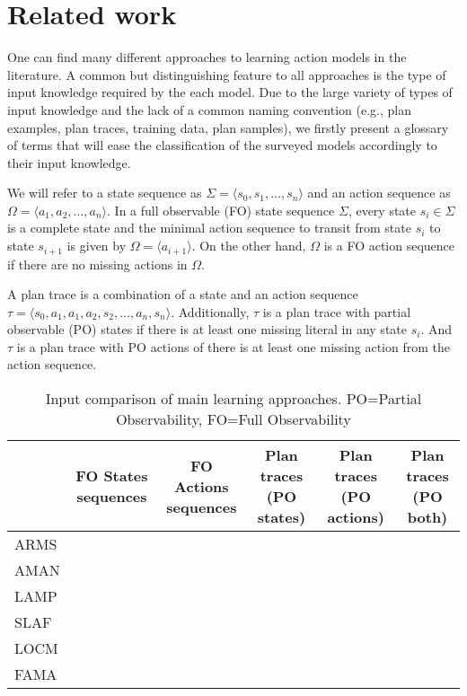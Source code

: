 
\section{Related work}
\label{sec:Section2}

One can find many different approaches to learning action models in the literature. A common but distinguishing feature to all approaches is the type of input knowledge required by the each model. Due to the large variety of types of input knowledge and the lack of a common naming convention (e.g., plan examples, plan traces, training data, plan samples), we firstly present a glossary of terms that will ease the classification of the surveyed models accordingly to their input knowledge.

We will refer to a state sequence as $\Sigma = \langle s_0, s_1, \ldots, s_n \rangle$ and an action sequence as $\Omega = \langle a_1, a_2, \ldots, a_n \rangle$. In a full observable (FO) state sequence $\Sigma$, every state $s_i \in \Sigma$ is a complete state and the minimal action sequence to transit from state $s_i$ to state $s_{i+1}$  is given by $\Omega = \langle a_{i+1} \rangle$. On the other hand, $\Omega$ is a FO action sequence if there are no missing actions in $\Omega$.

A plan trace is a combination of a state and an action sequence $\tau = \langle s_0, a_1, a_1, a_2, s_2, \ldots, a_n, s_n \rangle$. Additionally, $\tau$ is a plan trace with partial observable (PO) states if there is at least one missing literal in any state $s_i$. And $\tau$ is a plan trace with PO actions of there is at least one missing action from the action sequence.

\begin{table}
	\small
	\centering
	\begin{tabular}{ l | c | c | c | c | c |}
		& \multicolumn{1}{|p{2cm}|}{FO States sequences} 
		& \multicolumn{1}{|p{2cm}|}{FO Actions sequences} 
		& \multicolumn{1}{|p{2cm}|}{Plan traces (PO states)}
		& \multicolumn{1}{|p{2cm}|}{Plan traces (PO actions)}
		& \multicolumn{1}{|p{2cm}|}{Plan traces (PO both)}   \\
		\hline			
		ARMS &  & \checkmark & \checkmark & & \\
		AMAN & & & \checkmark & &\\
		LAMP & & & \checkmark & &\\
		SLAF & & & \checkmark & &\\
		LOCM & & \checkmark & & &\\
		FAMA & \checkmark & \checkmark &  \checkmark & \checkmark & \checkmark \\
	\end{tabular}
	\caption{Input comparison of main learning approaches. PO=Partial Observability, FO=Full Observability}
	\label{table:input_comparison}
\end{table}	


